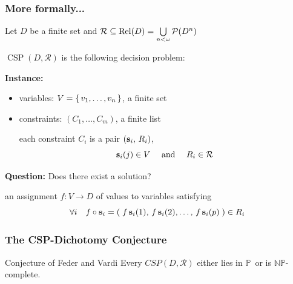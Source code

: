 \documentclass[10pt,xcolor=dvipsnames%
   ]{beamer}
\DeclareMathOperator{\Rel}{Rel}
\DeclareMathOperator{\CSP}{CSP}
\renewcommand{\.}{\cdot}
\newcommand{\sR}{\ensuremath{\mathcal{R}}}
\newcommand{\sP}{\ensuremath{\mathcal{P}}}
\newcommand{\NP}{\ensuremath{\mathbb{NP}}\xspace}
\renewcommand{\P}{\ensuremath{\mathbb{P}}\xspace}
\begin{document}
\begin{frame}  
  \frametitle{More formally...}

  Let $D$ be a finite set and $\sR \sseq \Rel(D)= \bigcup\limits_{n< \omega} \sP(D^n)$

  $\CSP(D,\sR)$ is the following decision problem:

  \textbf{Instance:}
\vskip-3mm
  \begin{itemize}
  \item 
  \alert{variables}: $V=\left\{\,v_1,\dots,v_n\,\right\}$, a finite set 

\item  \alert{constraints}: $(C_1,\dots,C_m)$, a finite list 

  \medskip

  each constraint $C_i$ is a pair $(\mathbf s_i,\, R_i)$,
  \[\bs_i(j) \in V\quad \text{ and } \quad R_i\in \sR\]
  \end{itemize}

  \textbf{Question:} Does there exist a \alert{solution}? 

  an assignment $f \colon V\to D$ of values to variables satisfying
  \[\forall i \quad
  f \circ \mathbf s_i = (\; f \, \mathbf s_i(1) ,\, f\,  \mathbf s_i(2) ,\dots, \, f \, \mathbf s_i(p)  \; )\in R_i \]


\end{frame}

\begin{frame}
  \frametitle{The CSP-Dichotomy Conjecture}

  \begin{exampleblock}{Conjecture of Feder and Vardi}
  Every $CSP(D, \sR)$ either lies in \P\ or is $\NP$-complete.
  \end{exampleblock}

\end{frame}
\end{document}
